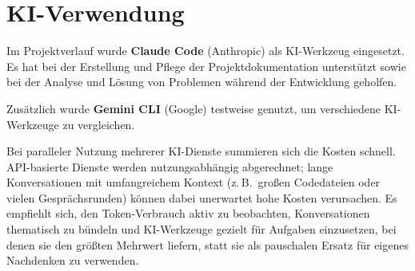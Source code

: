 \chapter{KI-Verwendung}
\label{cha:ki}

Im Projektverlauf wurde \textbf{Claude Code} (Anthropic) als KI-Werkzeug eingesetzt. Es hat bei der Erstellung und Pflege der Projektdokumentation unterstützt sowie bei der Analyse und Lösung von Problemen während der Entwicklung geholfen.

Zusätzlich wurde \textbf{Gemini CLI} (Google) testweise genutzt, um verschiedene KI-Werkzeuge zu vergleichen.

Bei paralleler Nutzung mehrerer KI-Dienste summieren sich die Kosten schnell. API-basierte Dienste werden nutzungsabhängig abgerechnet; lange Konversationen mit umfangreichem Kontext (z.\,B.\ großen Codedateien oder vielen Gesprächsrunden) können dabei unerwartet hohe Kosten verursachen. Es empfiehlt sich, den Token-Verbrauch aktiv zu beobachten, Konversationen thematisch zu bündeln und KI-Werkzeuge gezielt für Aufgaben einzusetzen, bei denen sie den größten Mehrwert liefern, statt sie als pauschalen Ersatz für eigenes Nachdenken zu verwenden.
